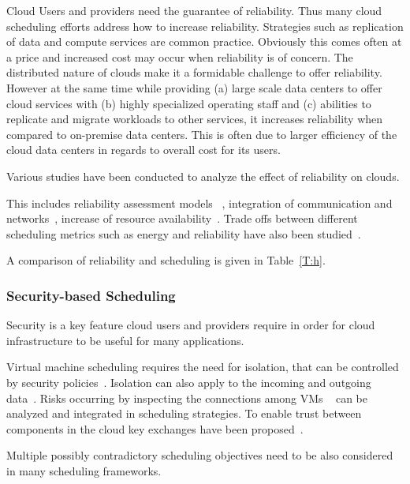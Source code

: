 \documentclass[final,5p,times,twocolumn]{elsarticle}
\begin{document}
Cloud Users and providers need the guarantee of reliability. Thus many
cloud scheduling efforts address how to increase
reliability. Strategies such as replication of data and compute
services are common practice. Obviously this comes often at a price
and increased cost may occur when reliability is of concern. The
distributed nature of clouds make it a formidable challenge to offer
reliability. However at the same time while providing (a) large scale
data centers to offer cloud services with (b) highly specialized
operating staff and (c) abilities to replicate and migrate workloads
to other services, it increases reliability when compared to
on-premise data centers. This is often due to larger efficiency of the
cloud data centers in regards to overall cost for its users.

Various studies have been conducted to analyze the effect of reliability on clouds.

This includes reliability assessment models
~\cite{malik2012reliability}, integration of communication and
networks~\cite{jing2015reliability}, increase of resource
availability~\cite{latiff2016fault}. Trade offs between different
scheduling metrics such as energy and reliability have also been
studied~\cite{tang2016energy}.

A comparison of reliability and scheduling is given in Table~\ref{T:h}.

%

\subsubsection{Security-based Scheduling}\label{sec:security}


Security is a key feature cloud users and providers require in order
for cloud infrastructure to be useful for many applications.

Virtual machine scheduling requires the need for isolation, that can
be controlled by security
policies~\cite{afoulki2011security}. Isolation can also apply to the
incoming and outgoing data~\cite{chejerla2017qos,kashyap2014security}.
Risks occurring by inspecting the connections among VMs
~\cite{shetty2016security} can be analyzed and integrated in
scheduling strategies.  To enable trust between components in the
cloud key exchanges have been proposed~\cite{liu2013ccbke}.

Multiple possibly contradictory scheduling objectives need to be also
considered in many scheduling frameworks.
\end{document}
